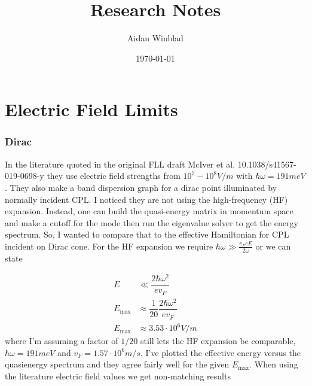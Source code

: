 \documentclass[10pt,letterpaper]{book}
\title{Research Notes}
\author{Aidan Winblad}
\date{\today}
\begin{document}
\section{Electric Field Limits}

\subsubsection{Dirac}
In the literature quoted in the original FLL draft McIver et al. 10.1038/s41567-019-0698-y they use electric field strengths from $10^7-10^8 V/m$ with $\hbar\omega=191meV$.
They also make a band dispersion graph for a dirac point illuminated by normally incident CPL.
I noticed they are not using the high-frequency (HF) expansion.
Instead, one can build the quasi-energy matrix in momentum space and make a cutoff for the mode then run the eigenvalue solver to get the energy spectrum.
So, I wanted to compare that to the effective Hamiltonian for CPL incident on Dirac cone.
For the HF expansion we require $\hbar \omega \gg \tfrac{v_{F} e E}{2\omega}$ or we can state

\begin{align}
  E &\ll \dfrac{2 \hbar \omega^2}{e v_{F}} \\
  E_{\text{max}} &\approx \dfrac{1}{20} \dfrac{2 \hbar \omega^2}{e v_{F}} \\
  E_{\text{max}} &\approx 3.53 \cdot 10^6 V/m
\end{align}
where I'm assuming a factor of $1/20$ still lets the HF expansion be comparable, $\hbar \omega = 191meV$ and $v_{F} = 1.57 \cdot 10^6 m/s$.
I've plotted the effective energy versus the quasienergy spectrum and they agree fairly well for the given $E_{\text{max}}$.
When using the literature electric field values we get non-matching results
\end{document}
